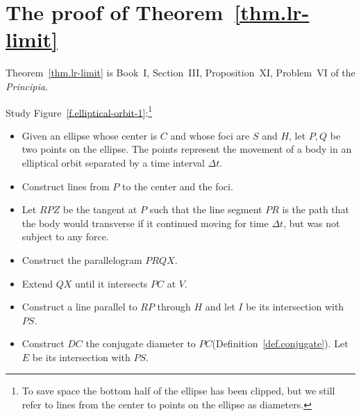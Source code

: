 

\section{The proof of Theorem~\ref{thm.lr-limit}}
\label{s.centripetal}

Theorem~\ref{thm.lr-limit} is Book~I, Section~III, Proposition~XI, Problem~VI of the \emph{Principia}.

Study Figure~\ref{f.elliptical-orbit-1}:\footnote{To save space the bottom half of the ellipse has been clipped, but we still refer to lines from the center to points on the ellipse as diameters.}
\begin{itemize}
\item  Given an ellipse whose center is $C$ and whose foci are $S$ and $H$, let $P,Q$ be two points on the ellipse. The points represent the movement of a body in an elliptical orbit separated by a time interval $\Delta t$.

\item Construct lines from $P$ to the center and the foci. 

\item Let $RPZ$ be the tangent at $P$ such that the line segment $PR$ is the path that the body would transverse if it continued moving for time $\Delta t$, but was not subject to any force.

\item Construct the parallelogram $PRQX$.

\item Extend $QX$ until it intersects $PC$ at $V$.

\item Construct a line parallel to $RP$ through $H$ and let $I$ be its intersection with $PS$. 

\item Construct $DC$ the conjugate diameter to $PC$(Definition~\ref{def.conjugate}). Let $E$ be its intersection with $PS$.
\end{itemize}


